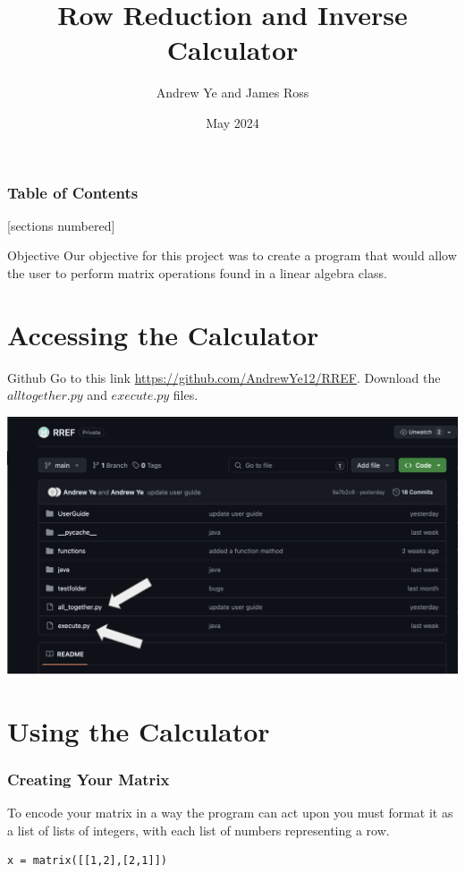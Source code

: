 \documentclass{beamer}
\title{Row Reduction and Inverse Calculator}
\author{Andrew Ye and James Ross}
\date{May 2024}
\begin{document}
\frame{\titlepage}

\begin{frame}
\frametitle{Table of Contents}
[sections numbered]
\tableofcontents
\end{frame}

\begin{frame}{Objective}
    Our objective for this project was to create a program that would allow the user to perform matrix operations found in a linear algebra class.
\end{frame}

\section{Accessing the Calculator}

\begin{frame}{Github}
    Go to this link \url{https://github.com/AndrewYe12/RREF}. Download the \(alltogether.py\) and \(execute.py\) files. \\
    \begin{center}
    \includegraphics[scale = 0.3]{photos/photo2.png}
    \end{center}
\end{frame}

\section{Using the Calculator}

\begin{frame}[fragile = singleslide]\frametitle{Creating Your Matrix}
    To encode your matrix in a way the program can act upon you must format it as a list of lists of integers, with each list of numbers representing a row.
\begin{verbatim}
x = matrix([[1,2],[2,1]]) 
\end{verbatim}
\end{frame}
\end{document}
